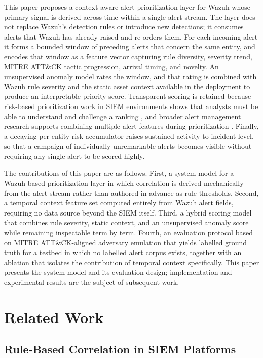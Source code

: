 \documentclass[conference]{IEEEtran}
\begin{document}
This paper proposes a context-aware alert prioritization layer for Wazuh whose primary signal is derived across time within a single alert stream. The layer does not replace Wazuh's detection rules or introduce new detections; it consumes alerts that Wazuh has already raised and re-orders them. For each incoming alert it forms a bounded window of preceding alerts that concern the same entity, and encodes that window as a feature vector capturing rule diversity, severity trend, MITRE ATT\&CK tactic progression, arrival timing, and novelty. An unsupervised anomaly model rates the window, and that rating is combined with Wazuh rule severity and the static asset context available in the deployment to produce an interpretable priority score. Transparent scoring is retained because risk-based prioritization work in SIEM environments shows that analysts must be able to understand and challenge a ranking \cite{ref9}, and broader alert management research supports combining multiple alert features during prioritization \cite{ref10}. Finally, a decaying per-entity risk accumulator raises sustained activity to incident level, so that a campaign of individually unremarkable alerts becomes visible without requiring any single alert to be scored highly.

The contributions of this paper are as follows. First, a system model for a Wazuh-based prioritization layer in which correlation is derived mechanically from the alert stream rather than authored in advance as rule thresholds. Second, a temporal context feature set computed entirely from Wazuh alert fields, requiring no data source beyond the SIEM itself. Third, a hybrid scoring model that combines rule severity, static context, and an unsupervised anomaly score while remaining inspectable term by term. Fourth, an evaluation protocol based on MITRE ATT\&CK-aligned adversary emulation \cite{ref12} that yields labelled ground truth for a testbed in which no labelled alert corpus exists, together with an ablation that isolates the contribution of temporal context specifically. This paper presents the system model and its evaluation design; implementation and experimental results are the subject of subsequent work.

\section{Related Work}

\subsection{Rule-Based Correlation in SIEM Platforms}
\end{document}

